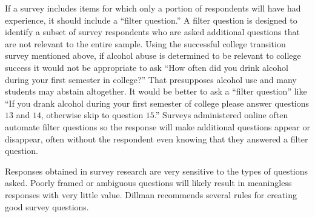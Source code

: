 If a survey includes items for which only a portion of respondents will have had experience, it should include a ``filter question.'' A filter question is designed to identify a subset of survey respondents who are asked additional questions that are not relevant to the entire sample. Using the successful college transition survey mentioned above, if alcohol abuse is determined to be relevant to college success it would not be appropriate to ask ``How often did you drink alcohol during your first semester in college?'' That presupposes alcohol use and many students may abstain altogether. It would be better to ask a ``filter question'' like ``If you drank alcohol during your first semester of college please answer questions $ 13 $ and $ 14 $, otherwise skip to question $ 15 $.'' Surveys administered online often automate filter questions so the response will make additional questions appear or disappear, often without the respondent even knowing that they answered a filter question.

Responses obtained in survey research are very sensitive to the types of questions asked. Poorly framed or ambiguous questions will likely result in meaningless responses with very little value. Dillman\cite{dillman2011mail} recommends several rules for creating good survey questions.

